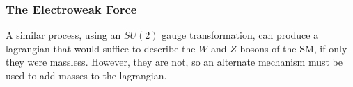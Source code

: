 








\subsubsection{The Electroweak Force}
\label{sec:ew}

A similar process, using an $SU(2)$ gauge transformation, can produce a lagrangian that would suffice to describe the $W$ and $Z$ bosons of the \ac{SM}, if only they were massless. However, they are not, so an alternate mechanism must be used to add masses to the lagrangian. 

